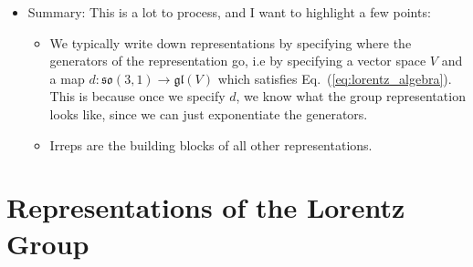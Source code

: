 \documentclass[12pt, oneside]{article}   	%
\theoremstyle{definition}
\begin{document}
\begin{itemize}
	\item Summary: This is a lot to process, and I want to highlight a few points:
	\begin{itemize}
		\item We typically write down representations by specifying where the generators of the representation go, i.e by specifying a vector space $V$ and a map $d : \mathfrak{so}(3, 1)\rightarrow \mathfrak{gl}(V)$ which satisfies Eq.~(\ref{eq:lorentz_algebra}). This is because once we specify $d$, we know what the group representation looks like, since we can just exponentiate the generators. 
		\item Irreps are the building blocks of all other representations. 
	\end{itemize}
	
\end{itemize}


\section*{Representations of the Lorentz Group}
\end{document}
